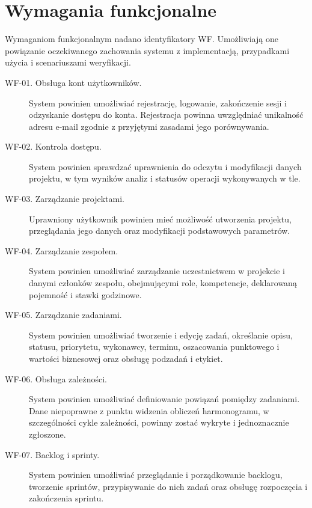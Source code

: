 \section{Wymagania funkcjonalne}
\label{sec:wymagania-funkcjonalne}

Wymaganiom funkcjonalnym nadano identyfikatory WF. Umożliwiają one powiązanie oczekiwanego zachowania systemu z implementacją, przypadkami użycia i scenariuszami weryfikacji.

\begin{description}
    \item[WF-01. Obsługa kont użytkowników.]
    System powinien umożliwiać rejestrację, logowanie, zakończenie sesji i odzyskanie dostępu do konta. Rejestracja powinna uwzględniać unikalność adresu e-mail zgodnie z przyjętymi zasadami jego porównywania.

    \item[WF-02. Kontrola dostępu.]
    System powinien sprawdzać uprawnienia do odczytu i modyfikacji danych projektu, w tym wyników analiz i statusów operacji wykonywanych w tle.

    \item[WF-03. Zarządzanie projektami.]
    Uprawniony użytkownik powinien mieć możliwość utworzenia projektu, przeglądania jego danych oraz modyfikacji podstawowych parametrów.

    \item[WF-04. Zarządzanie zespołem.]
    System powinien umożliwiać zarządzanie uczestnictwem w projekcie i danymi członków zespołu, obejmującymi role, kompetencje, deklarowaną pojemność i stawki godzinowe.

    \item[WF-05. Zarządzanie zadaniami.]
    System powinien umożliwiać tworzenie i edycję zadań, określanie opisu, statusu, priorytetu, wykonawcy, terminu, oszacowania punktowego i wartości biznesowej oraz obsługę podzadań i etykiet.

    \item[WF-06. Obsługa zależności.]
    System powinien umożliwiać definiowanie powiązań pomiędzy zadaniami. Dane niepoprawne z punktu widzenia obliczeń harmonogramu, w szczególności cykle zależności, powinny zostać wykryte i jednoznacznie zgłoszone.

    \item[WF-07. Backlog i sprinty.]
    System powinien umożliwiać przeglądanie i porządkowanie backlogu, tworzenie sprintów, przypisywanie do nich zadań oraz obsługę rozpoczęcia i zakończenia sprintu.


\end{description}
